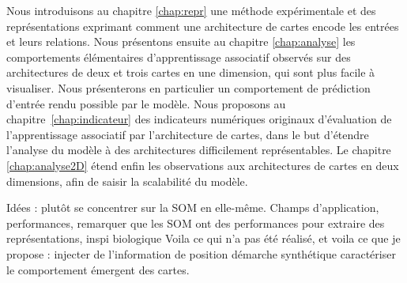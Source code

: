 Nous introduisons au chapitre \ref{chap:repr} une méthode expérimentale et des représentations exprimant comment une architecture de cartes encode les entrées et leurs relations.
Nous présentons ensuite au chapitre \ref{chap:analyse} les comportements élémentaires d'apprentissage associatif observés sur des architectures de deux et trois cartes en une dimension, qui sont plus facile à visualiser. 
Nous présenterons en particulier un comportement de prédiction d'entrée rendu possible par le modèle.
Nous proposons au chapitre~\ref{chap:indicateur} des indicateurs numériques originaux d'évaluation de l'apprentissage associatif par l'architecture de cartes, dans le but d'étendre l'analyse du modèle à des architectures difficilement représentables.
Le chapitre \ref{chap:analyse2D} étend enfin les observations aux architectures de cartes en deux dimensions, afin de saisir la scalabilité du modèle.




Idées : plutôt se concentrer sur la SOM en elle-même. Champs d'application, performances, remarquer que les SOM ont des performances pour extraire des représentations, inspi biologique
Voila ce qui n'a pas été réalisé, et voila ce que je propose : injecter de l'information de position 
démarche synthétique
caractériser le comportement émergent des cartes.







